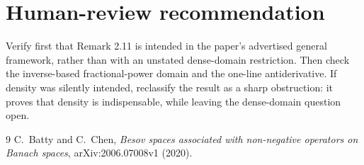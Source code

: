 \documentclass[11pt]{article}
\begin{document}
\section{Human-review recommendation}

Verify first that Remark 2.11 is intended in the paper's advertised general
framework, rather than with an unstated dense-domain restriction.  Then check
the inverse-based fractional-power domain and the one-line antiderivative.  If
density was silently intended, reclassify the result as a sharp obstruction:
it proves that density is indispensable, while leaving the dense-domain
question open.

\begin{thebibliography}{9}
C.~Batty and C.~Chen,
\emph{Besov spaces associated with non-negative operators on Banach spaces},
arXiv:2006.07008v1 (2020).
\end{thebibliography}
\end{document}

